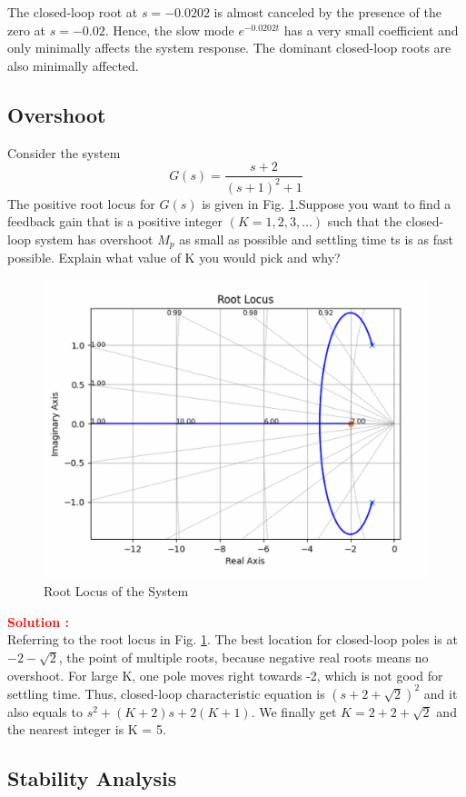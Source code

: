 \documentclass[12pt]{article}
\begin{document}
The closed-loop root at $s=-0.0202$ is almost canceled by the presence of the zero at $s=-0.02$. Hence, the slow mode $e^{-0.0202 t}$ has a very small coefficient and only minimally affects the system response. The dominant closed-loop roots are also minimally affected.
\clearpage

\subsection{Overshoot}

Consider the system 
\[
G(s)=\frac{s + 2}{(s+1)^2 +1}
\]
The positive root locus for $G(s)$ is given in Fig. \ref{fig:prb38}.Suppose you want to find a feedback gain that is a positive integer $(K = 1, 2, 3, \hdots )$ such that the
closed-loop system has overshoot $M_p$ as small as possible and settling time ts is as fast possible. Explain what value of K you would pick and why?\\
\begin{figure}[H]
    \centering
    \includegraphics[width=0.6\linewidth]{figs/7.6.png}
    \caption{Root Locus of the System}
    \label{fig:prb38}
\end{figure}
\textbf{\textcolor{red}{Solution :}} \\
Referring to the root locus in Fig. \ref{fig:prb38}. The best location for closed-loop poles is at $-2-\sqrt{2}$, the point of multiple roots, because negative real roots means no overshoot. For large K, one pole moves right towards -2, which is not good for settling time. Thus, closed-loop characteristic equation is $(s+2+\sqrt{2})^2$ and it also equals to $s^2+(K+2)s+2(K+1)$. We finally get $K = 2 + 2+\sqrt{2}$ and the nearest integer is K = 5.\\ 
\clearpage

\subsection{Stability Analysis}
\end{document}
